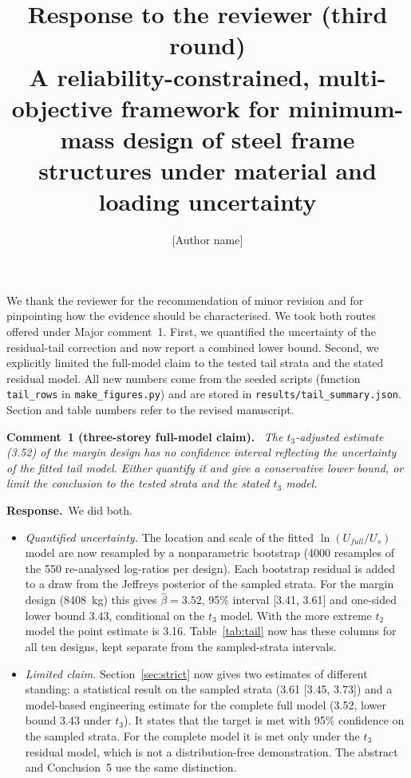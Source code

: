\documentclass[11pt]{article}
\title{Response to the reviewer (third round)\\[0.3em]\large A reliability-constrained, multi-objective
framework for minimum-mass design of steel frame structures under material and loading uncertainty}
\author{[Author name]}
\date{}
\newenvironment{comment}[1]{\par\medskip\noindent\textbf{Comment~#1.}\ \itshape}{\par}
\newcommand{\resp}{\par\noindent\textbf{Response.}\ }
\begin{document}
\maketitle

We thank the reviewer for the recommendation of minor revision and for pinpointing how the evidence
should be characterised. We took both routes offered under Major comment~1. First, we quantified the
uncertainty of the residual-tail correction and now report a combined lower bound. Second, we
explicitly limited the full-model claim to the tested tail strata and the stated residual model. All
new numbers come from the seeded scripts (function \texttt{tail\_rows} in \texttt{make\_figures.py})
and are stored in \texttt{results/tail\_summary.json}. Section and table numbers refer to the revised
manuscript.

\begin{comment}{1 (three-storey full-model claim)}
The $t_3$-adjusted estimate (3.52) of the margin design has no confidence interval reflecting the
uncertainty of the fitted tail model. Either quantify it and give a conservative lower bound, or
limit the conclusion to the tested strata and the stated $t_3$ model.
\end{comment}
\resp We did both.
\begin{itemize}[itemsep=0.1em]
\item \emph{Quantified uncertainty.} The location and scale of the fitted $\ln(U_{full}/U_s)$ model
are now resampled by a nonparametric bootstrap (4000 resamples of the 550 re-analysed log-ratios
per design). Each bootstrap residual is added to a draw from the Jeffreys posterior of the sampled
strata. For the margin design (8408~kg) this gives $\hat\beta=3.52$, 95\% interval [3.41, 3.61] and
one-sided lower bound 3.43, conditional on the $t_3$ model. With the more extreme $t_2$ model the
point estimate is 3.16. Table~\ref{tab:tail} now has these columns for all ten designs, kept
separate from the sampled-strata intervals.
\item \emph{Limited claim.} Section~\ref{sec:strict} now gives two estimates of different standing:
a statistical result on the sampled strata (3.61 [3.45, 3.73]) and a model-based engineering estimate
for the complete full model (3.52, lower bound 3.43 under $t_3$). It states that the target is met with
95\% confidence on the sampled strata. For the complete model it is met only under the $t_3$
residual model, which is not a distribution-free demonstration. The abstract and Conclusion~5 use the
same distinction.
\end{itemize}
\end{document}
